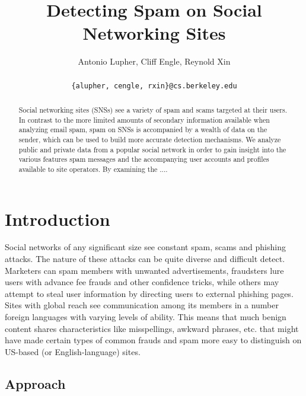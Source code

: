\documentclass[preprint]{acm_proc_article-sp}
\begin{document}
\title{Detecting Spam on Social Networking Sites}

\author{
Antonio Lupher,
Cliff Engle,
Reynold Xin\\\\
\texttt{\{alupher, cengle, rxin\}@cs.berkeley.edu}
}


\maketitle
\begin{abstract}
Social networking sites (SNSs) see a variety of spam and scams targeted at 
their users. In contrast to the more limited amounts of secondary information 
available when analyzing email spam, spam on SNSs is accompanied by a wealth 
of data on the sender, which can be used to build more accurate detection mechanisms. 
We analyze public and private data from a popular social network in order to 
gain insight into the various features spam messages and the accompanying user 
accounts and profiles available to site operators. By examining the ....
\end{abstract}


\maketitle

\section{Introduction}

Social networks of any significant size see constant spam, scams
and phishing attacks. The nature of these attacks can be quite diverse
and difficult detect. Marketers can spam members with unwanted
advertisements, fraudsters lure users with advance fee frauds and
other confidence tricks, while others may attempt to steal user
information by directing users to external phishing pages. 
Sites with global reach see communication among its members in a 
number foreign languages with varying levels
of ability. This means that much benign content shares characteristics
like misspellings, awkward phrases, etc. that might have made certain
types of common frauds and spam more easy to distinguish on US-based
(or English-language) sites.

\subsection{Approach}
\end{document}
